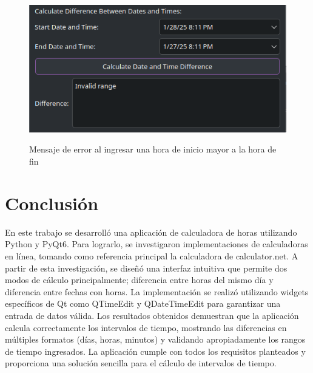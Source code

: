 \documentclass[conference]{IEEEtran}
\begin{document}
    \begin{figure}[H]
        {\includegraphics[width=\breite\columnwidth]{images/error2.png}}
        \caption{Mensaje de error al ingresar una hora de inicio mayor a la hora de fin}
        \label{fig:error2}
    \end{figure}

\section{Conclusión}
    En este trabajo se desarrolló una aplicación de calculadora de horas utilizando Python y PyQt6. Para lograrlo, se investigaron implementaciones de calculadoras en línea, tomando como referencia principal la calculadora de calculator.net. A partir de esta investigación, se diseñó una interfaz intuitiva que permite dos modos de cálculo principalmente; diferencia entre horas del mismo día y diferencia entre fechas con horas. La implementación se realizó utilizando widgets específicos de Qt como QTimeEdit y QDateTimeEdit para garantizar una entrada de datos válida. Los resultados obtenidos demuestran que la aplicación calcula correctamente los intervalos de tiempo, mostrando las diferencias en múltiples formatos (días, horas, minutos) y validando apropiadamente los rangos de tiempo ingresados. La aplicación cumple con todos los requisitos planteados y proporciona una solución sencilla para el cálculo de intervalos de tiempo.

\printbibliography
\end{document}
